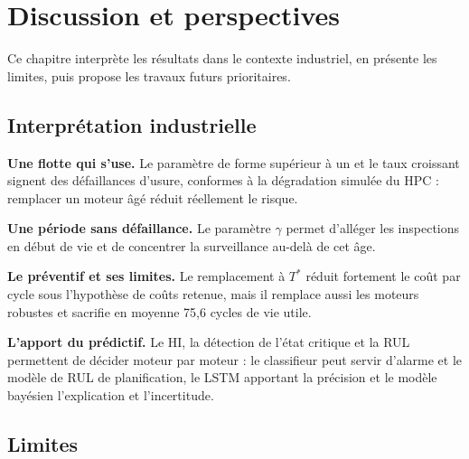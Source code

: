 \chapter{Discussion et perspectives}\label{sec:discussion}

\chapintro

Ce chapitre interprète les résultats dans le contexte industriel, en présente les limites, puis propose les travaux futurs prioritaires.

\section{Interprétation industrielle}\label{sec:interpretation}

\textbf{Une flotte qui s'use.} Le paramètre de forme supérieur à un et le taux croissant signent des défaillances d'usure, conformes à la dégradation simulée du HPC : remplacer un moteur âgé réduit réellement le risque.

\textbf{Une période sans défaillance.} Le paramètre $\gamma$ permet d'alléger les inspections en début de vie et de concentrer la surveillance au-delà de cet âge.

\textbf{Le préventif et ses limites.} Le remplacement à $T^*$ réduit fortement le coût par cycle sous l'hypothèse de coûts retenue, mais il remplace aussi les moteurs robustes et sacrifie en moyenne 75,6 cycles de vie utile.

\textbf{L'apport du prédictif.} Le HI, la détection de l'état critique et la RUL permettent de décider moteur par moteur : le classifieur peut servir d'alarme et le modèle de RUL de planification, le LSTM apportant la précision et le modèle bayésien l'explication et l'incertitude.

\section{Limites}\label{sec:limites}

